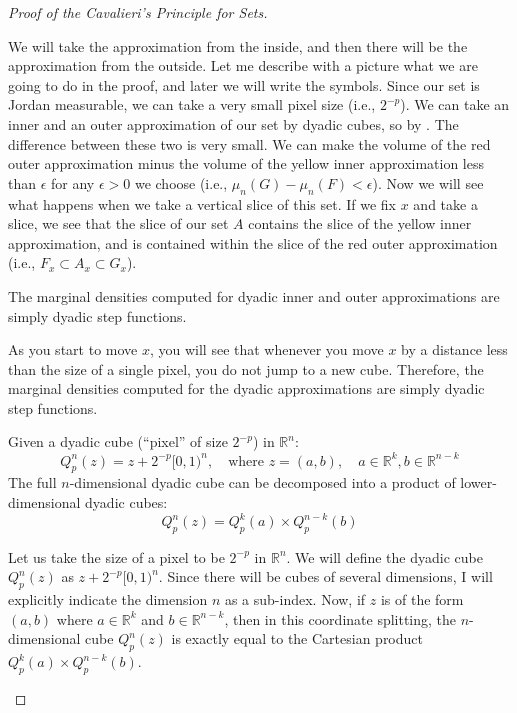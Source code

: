 \begin{proof}[Proof of the Cavalieri's Principle for Sets]
\begin{spoken-clean}[00:04:08 - 00:05:00]
We will take the approximation from the inside, and then there will be the approximation from the outside. Let me describe with a picture what we are going to do in the proof, and later we will write the symbols. Since our set is Jordan measurable, we can take a very small pixel size (i.e., $2^{-p}$). We can take an inner and an outer approximation of our set by dyadic cubes, so by . The difference between these two is very small. We can make the volume of the red outer approximation minus the volume of the yellow inner approximation less than $\epsilon$ for any $\epsilon > 0$ we choose (i.e., $\mu_n(G) - \mu_n(F) < \epsilon$). Now we will see what happens when we take a vertical slice of this set. If we fix $x$ and take a slice, we see that the slice of our set $A$ contains the slice of the yellow inner approximation, and is contained within the slice of the red outer approximation (i.e., $F_x \subset A_x \subset G_x$).
\end{spoken-clean}

\begin{math-stroke}
The marginal densities computed for dyadic inner and outer approximations are simply dyadic step functions.
\end{math-stroke}

\begin{spoken-clean}[00:05:00 - 00:06:00]
As you start to move $x$, you will see that whenever you move $x$ by a distance less than the size of a single pixel, you do not jump to a new cube. Therefore, the marginal densities computed for the dyadic approximations are simply dyadic step functions.
\end{spoken-clean}

\begin{math-stroke}
Given a dyadic cube (``pixel'' of size $2^{-p}$) in $\mathbb{R}^n$:
\[
Q_p^n(z) = z + 2^{-p} [0,1)^n, \quad \text{where } z = (a,b), \quad a \in \mathbb{R}^k, b \in \mathbb{R}^{n-k}
\]
The full $n$-dimensional dyadic cube can be decomposed into a product of lower-dimensional dyadic cubes:
\[
Q_p^n(z) = Q_p^k(a) \times Q_p^{n-k}(b)
\]
\end{math-stroke}

\begin{spoken-clean}[00:06:00 - 00:07:10]
Let us take the size of a pixel to be $2^{-p}$ in $\mathbb{R}^n$. We will define the dyadic cube $Q_p^n(z)$ as $z + 2^{-p} [0,1)^n$. Since there will be cubes of several dimensions, I will explicitly indicate the dimension $n$ as a sub-index. Now, if $z$ is of the form $(a,b)$ where $a \in \mathbb{R}^k$ and $b \in \mathbb{R}^{n-k}$, then in this coordinate splitting, the $n$-dimensional cube $Q_p^n(z)$ is exactly equal to the Cartesian product $Q_p^k(a) \times Q_p^{n-k}(b)$.
\end{spoken-clean}


\end{proof}
